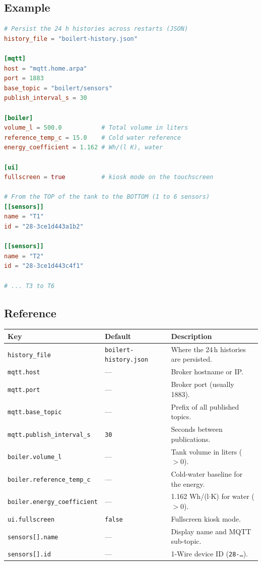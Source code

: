 \documentclass[11pt,a4paper,parskip=half]{scrartcl}
\newcommand{\code}[1]{\texttt{#1}}
\begin{document}
\subsection{Example}

\begin{lstlisting}[language=toml]
# Persist the 24 h histories across restarts (JSON)
history_file = "boilert-history.json"

[mqtt]
host = "mqtt.home.arpa"
port = 1883
base_topic = "boilert/sensors"
publish_interval_s = 30

[boiler]
volume_l = 500.0           # Total volume in liters
reference_temp_c = 15.0    # Cold water reference
energy_coefficient = 1.162 # Wh/(l K), water

[ui]
fullscreen = true          # kiosk mode on the touchscreen

# From the TOP of the tank to the BOTTOM (1 to 6 sensors)
[[sensors]]
name = "T1"
id = "28-3ce1d443a1b2"

[[sensors]]
name = "T2"
id = "28-3ce1d443c4f1"

# ... T3 to T6
\end{lstlisting}

\subsection{Reference}

\begin{center}
\begin{tabularx}{\textwidth}{@{}llX@{}}
\toprule
\textbf{Key} & \textbf{Default} & \textbf{Description}\\
\midrule
\code{history\_file} & \code{boilert-history.json} & Where the 24\,h histories are persisted.\\
\code{mqtt.host} & --- & Broker hostname or IP.\\
\code{mqtt.port} & --- & Broker port (usually 1883).\\
\code{mqtt.base\_topic} & --- & Prefix of all published topics.\\
\code{mqtt.publish\_interval\_s} & \code{30} & Seconds between publications.\\
\code{boiler.volume\_l} & --- & Tank volume in liters ($>0$).\\
\code{boiler.reference\_temp\_c} & --- & Cold-water baseline for the energy.\\
\code{boiler.energy\_coefficient} & --- & 1.162 Wh/(l$\cdot$K) for water ($>0$).\\
\code{ui.fullscreen} & \code{false} & Fullscreen kiosk mode.\\
\code{sensors[].name} & --- & Display name and MQTT sub-topic.\\
\code{sensors[].id} & --- & 1-Wire device ID (\code{28-\dots}).\\
\bottomrule
\end{tabularx}
\end{center}
\end{document}
